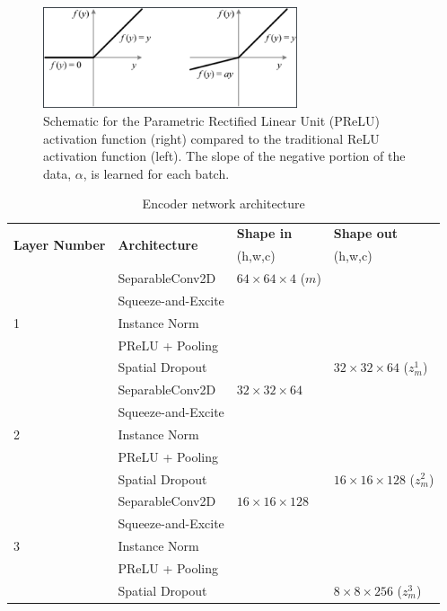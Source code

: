 \documentclass[10pt, twoside]{article}
\begin{document}
\begin{figure}[h]
    \centering
    \includegraphics[width=7.5cm]{figures/prelu.png}
    \caption{Schematic for the Parametric Rectified Linear Unit (PReLU) activation function (right) compared to the traditional ReLU activation function (left). The slope of the negative portion of the data, $\alpha$, is learned for each batch.}
    \label{prelu}
\end{figure}

\begin{table}[t]
    \caption{Encoder network architecture}\label{tab1}
    \centering
    \begin{tabular}{@{} llll @{} }
    \toprule
        \multirow{2}{*}{\textbf{Layer Number}} & \multirow{2}{*}{\textbf{Architecture}} & \textbf{Shape in} & \textbf{Shape out} \\
         &    & (h,w,c)   & (h,w,c)            \\
    \midrule
        \multirow{5}{*}{1} & SeparableConv2D    &  $64\times64\times4$ ($m$) & \\
                           & Squeeze-and-Excite &  &  \\
                           & Instance Norm      &  &  \\
                           & PReLU + Pooling    &  &  \\
                           & Spatial Dropout    &  & $32\times32\times64$ ($z_m^1$) \\
        \hline                      
        \multirow{5}{*}{2} & SeparableConv2D    & $32\times32\times64$ & \\
                           & Squeeze-and-Excite & & \\
                           & Instance Norm      & & \\
                           & PReLU + Pooling    & & \\
                           & Spatial Dropout    & & $16\times16\times128$ ($z_m^2$) \\
        \hline
        \multirow{5}{*}{3} & SeparableConv2D    & $16\times16\times128$ & \\
                           & Squeeze-and-Excite & & \\
                           & Instance Norm      & & \\
                           & PReLU + Pooling    & & \\
                           & Spatial Dropout    & & $8\times8\times256$  ($z_m^3$) \\
    \bottomrule
    \end{tabular}
\end{table}
\end{document}
